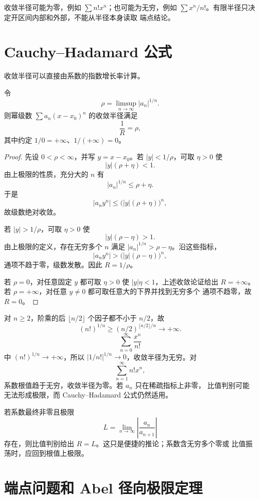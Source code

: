 收敛半径可能为零，例如 \(\sum n!x^n\)；也可能为无穷，例如
\(\sum x^n/n!\)。有限半径只决定开区间内部和外部，不能从半径本身读取
端点结论。

\section{Cauchy--Hadamard 公式}

收敛半径可以直接由系数的指数增长率计算。

\begin{theorem}
\label{thm:cauchy-hadamard}
令
\[
 \rho=\limsup_{n\to\infty}|a_n|^{1/n}.
\]
则幂级数 \(\sum a_n(x-x_0)^n\) 的收敛半径满足
\[
 \frac1R=\rho,
\]
其中约定 \(1/0=+\infty\)、\(1/(+\infty)=0\)。
\end{theorem}

\begin{proof}
先设 \(0<\rho<\infty\)，并写 \(y=x-x_0\)。若
\(|y|<1/\rho\)，可取 \(\eta>0\) 使
\[
 |y|(\rho+\eta)<1.
\]
由上极限的性质，充分大的 \(n\) 有
\[
 |a_n|^{1/n}\le\rho+\eta.
\]
于是
\[
 |a_ny^n|\le\bigl(|y|(\rho+\eta)\bigr)^n,
\]
故级数绝对收敛。

若 \(|y|>1/\rho\)，可取 \(\eta>0\) 使
\[
 |y|(\rho-\eta)>1.
\]
由上极限的定义，存在无穷多个 \(n\) 满足
\(|a_n|^{1/n}>\rho-\eta\)。沿这些指标，
\[
 |a_ny^n|>\bigl(|y|(\rho-\eta)\bigr)^n,
\]
通项不趋于零，级数发散。因此 \(R=1/\rho\)。

若 \(\rho=0\)，对任意固定 \(y\) 都可取 \(\eta>0\) 使
\(|y|\eta<1\)，上述收敛论证给出 \(R=+\infty\)。若
\(\rho=+\infty\)，对任意 \(y\ne0\) 都可取任意大的下界并找到无穷多个
通项不趋零，故 \(R=0\)。
\end{proof}

\begin{example}
对 \(n\ge2\)，阶乘的后 \(\lfloor n/2\rfloor\) 个因子都不小于 \(n/2\)，故
\[
 (n!)^{1/n}\ge(n/2)^{\lfloor n/2\rfloor/n}\longrightarrow+\infty.
\]
\[
 \sum_{n=0}^\infty\frac{x^n}{n!}
\]
中 \((n!)^{1/n}\to+\infty\)，所以
\(|1/n!|^{1/n}\to0\)，收敛半径为无穷。对
\[
 \sum_{n=1}^\infty n!x^n,
\]
系数根值趋于无穷，收敛半径为零。若 \(a_n\) 只在稀疏指标上非零，
比值判别可能无法形成极限，而 Cauchy--Hadamard 公式仍然适用。
\end{example}

若系数最终非零且极限
\[
 L=\lim_{n\to\infty}\left|\frac{a_n}{a_{n+1}}\right|
\]
存在，则比值判别给出 \(R=L\)。这只是便捷的推论；系数含无穷多个零或
比值振荡时，应回到根值上极限。

\section{端点问题和 Abel 径向极限定理}

